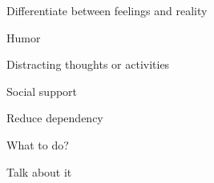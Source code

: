 \documentclass[aspectratio=169]{beamer}
\begin{document}
\begin{frame}
  \begin{center}
    \Huge Differentiate between feelings and reality
    \\ \small \cite{caltech}
  \end{center}
\end{frame}

\begin{frame}
  \begin{center}
    \Huge Humor
    \\ \small \cite{hh15}
  \end{center}
\end{frame}

\begin{frame}
  \begin{center}
    \Huge Distracting thoughts or activities
    \\ \small \cite{hh15}
  \end{center}
\end{frame}

\begin{frame}
  \begin{center}
    \Huge Social support
    \\ \small \cite{caltech}
  \end{center}
\end{frame}

\begin{frame}
  \begin{center}
    \Huge Reduce dependency
    \\ \small \cite{langford93}
  \end{center}
\end{frame}

\begin{frame}
  \begin{center}
    \Huge What to do?
  \end{center}
\end{frame}

\begin{frame}
  \begin{center}
    \Huge Talk about it
  \end{center}
\end{frame}
\end{document}
